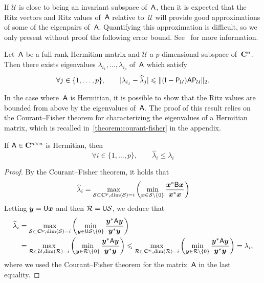 If $\mathcal U$ is close to being an invariant subspace of~$\mathsf A$,
then it is expected that the Ritz vectors and Ritz values of~$\mathsf A$ relative to~$\mathcal U$ will provide good approximations of some of the eigenpairs of~$\mathsf A$.
Quantifying this approximation is difficult,
so we only present without proof the following error bound.
See~\cite{MR1990645} for more information.
\begin{proposition}
    Let~$\mathsf A$ be a full rank Hermitian matrix and $\mathcal U$ a $p$-dimensional subspace of~$\mathbf C^n$.
    Then there exists eigenvalues $\lambda_{i_1}, \dotsc, \lambda_{i_p}$ of~$\mathsf A$ which satisfy
    \[
        \forall j \in \{1, \dotsc, p\}, \qquad
        \lvert\lambda_{i_j} - \widehat \lambda_j\rvert \leqslant \lVert(\mathsf I - \mathsf P_{\mathcal U}) \mathsf A \mathsf P_{\mathcal U}\rVert_2.
    \]
\end{proposition}

In the case where~$\mathsf A$ is Hermitian,
it is possible to show that the Ritz values are bounded from above by the eigenvalues of~$\mathsf A$.
The proof of this result relies on the Courant--Fisher theorem for characterizing the eigenvalues of a Hermitian matrix,
which is recalled in~\cref{theorem:courant-fisher} in the appendix.
\begin{proposition}
    If $\mathsf A \in \mathbf C^{n \times n}$ is Hermitian,
    then
    \[
        \forall i \in \{1, \dotsc, p\}, \qquad
        \widehat \lambda_i \leq \lambda_i
    \]
\end{proposition}
\begin{proof}
By the Courant--Fisher theorem,
it holds that
\[
    \widehat \lambda_i
    = \max_{\mathcal S \subset \mathbf C^p, {\rm dim}(\mathcal S) = i} \left( \min_{\mathbf{\boldsymbol{x}} \in \mathcal S \backslash\{0\}} \frac{\mathbf{\boldsymbol{x}}^* \mathsf B \mathbf{\boldsymbol{x}}}{\mathbf{\boldsymbol{x}}^* \mathbf{\boldsymbol{x}}} \right)
\]
Letting $\mathbf{\boldsymbol{y}} = \mathsf U \mathbf{\boldsymbol{x}}$ and then $\mathcal R = \mathsf U \mathcal S$,
we deduce that
\begin{align*}
    \widehat \lambda_i
    &= \max_{\mathcal S \subset \mathbf C^p, {\rm dim}(\mathcal S) = i} \left( \min_{\mathbf{\boldsymbol{y}} \in \mathsf U \mathcal S \backslash\{0\}} \frac{\mathbf{\boldsymbol{y}}^* \mathsf A \mathbf{\boldsymbol{y}}}{\mathbf{\boldsymbol{y}}^* \mathbf{\boldsymbol{y}}} \right) \\
    &= \max_{\mathcal R \subset \mathcal U, {\rm dim}(\mathcal R) = i} \left( \min_{\mathbf{\boldsymbol{y}} \in \mathcal R \backslash\{0\}} \frac{\mathbf{\boldsymbol{y}}^* \mathsf A \mathbf{\boldsymbol{y}}}{\mathbf{\boldsymbol{y}}^* \mathbf{\boldsymbol{y}}} \right)
    \leqslant \max_{\mathcal R \subset \mathbf C^n, {\rm dim}(\mathcal R) = i} \left( \min_{\mathbf{\boldsymbol{y}} \in \mathcal R \backslash\{0\}} \frac{\mathbf{\boldsymbol{y}}^* \mathsf A \mathbf{\boldsymbol{y}}}{\mathbf{\boldsymbol{y}}^* \mathbf{\boldsymbol{y}}} \right) = \lambda_i,
\end{align*}
where we used the Courant--Fisher theorem for the matrix~$\mathsf A$ in the last equality.
\end{proof}

